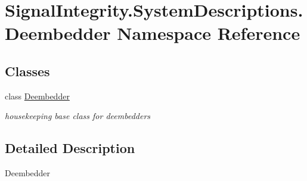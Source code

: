 \hypertarget{namespaceSignalIntegrity_1_1SystemDescriptions_1_1Deembedder}{}\section{Signal\+Integrity.\+System\+Descriptions.\+Deembedder Namespace Reference}
\label{namespaceSignalIntegrity_1_1SystemDescriptions_1_1Deembedder}
\subsection*{Classes}
\begin{DoxyCompactItemize}
\item 
class \hyperlink{classSignalIntegrity_1_1SystemDescriptions_1_1Deembedder_1_1Deembedder}{Deembedder}
\begin{DoxyCompactList}\small\item\em housekeeping base class for deembedders \end{DoxyCompactList}\end{DoxyCompactItemize}


\subsection{Detailed Description}
\begin{DoxyVerb}Deembedder\end{DoxyVerb}
 